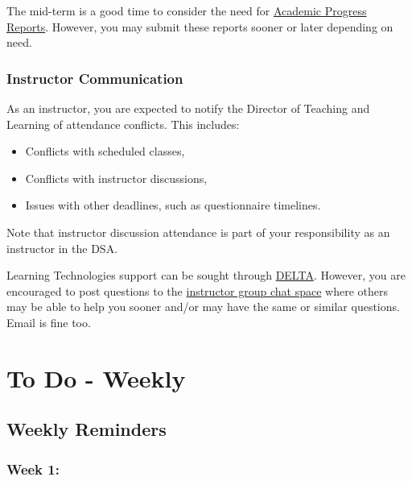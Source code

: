 \documentclass[
  letterpaper,
  DIV=11,
  numbers=noendperiod]{scrreprt}
\providecommand{\tightlist}{%
  \setlength{\itemsep}{0pt}\setlength{\parskip}{0pt}}
\begin{document}
The mid-term is a good time to consider the need for
\href{https://dasa.ncsu.edu/faculty-resources/academic-progress-reporting/}{Academic
Progress Reports}. However, you may submit these reports sooner or later
depending on need.

\subsection{Instructor Communication}\label{instructor-communication}

As an instructor, you are expected to notify the Director of Teaching
and Learning of attendance conflicts. This includes:

\begin{itemize}
\tightlist
\item
  Conflicts with scheduled classes,
\item
  Conflicts with instructor discussions,
\item
  Issues with other deadlines, such as questionnaire timelines.
\end{itemize}

Note that instructor discussion attendance is part of your
responsibility as an instructor in the DSA.

Learning Technologies support can be sought through
\href{https://delta.ncsu.edu/learntech-request/}{DELTA}. However, you
are encouraged to post questions to the
\href{https://chat.google.com/room/AAQA-rEg4KQ?cls=7}{instructor group
chat space} where others may be able to help you sooner and/or may have
the same or similar questions. Email is fine too.

\hfill\break


\chapter{To Do - Weekly}\label{to-do---weekly}

\section{Weekly Reminders}\label{weekly-reminders}

\subsection{Week 1:}\label{week-1}
\end{document}
